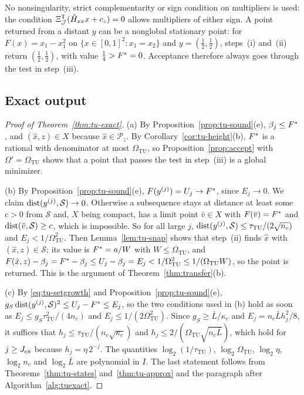No nonsingularity, strict complementarity or sign condition on multipliers is
used: the condition $\Xi_{\mathcal J}^{\mathsf T}(\hat H_{xx}x+c_z)=0$ allows
multipliers of either sign. A point returned from a distant $y$ can be a
nonglobal stationary point: for $F(x)=x_1-x_1^2$ on
$\{x\in[0,1]^2:x_1=x_2\}$ and $y=(\frac12,\frac12)$, steps~(i) and~(ii)
return $(\frac12,\frac12)$, with value $\frac14>F^{*}=0$. Acceptance therefore
always goes through the test in step~(iii).

\subsection{Exact output}\label{app:tu-exact-proof}

\begin{proof}[Proof of Theorem~\ref{thm:tu-exact}]
(a) By Proposition~\ref{prop:tu-sound}(e), $\beta_j\le F^{*}$, and
$(\hat x,z)\in X$ because $\hat x\in\mathcal P_z$. By
Corollary~\ref{cor:tu-height}(b), $F^{*}$ is a rational with denominator at most
$\Omega_{\mathrm{TU}}$, so Proposition~\ref{prop:accept} with
$\Omega'=\Omega_{\mathrm{TU}}$ shows that a point that passes the test in
step~(iii) is a global minimizer.

(b) By Proposition~\ref{prop:tu-sound}(e), $F(y^{(j)})=U_j\to F^{*}$, since
$E_j\to0$. We claim $\operatorname{dist}(y^{(j)},\mathcal S)\to0$. Otherwise a subsequence
stays at distance at least some $c>0$ from $\mathcal S$ and, $X$ being compact,
has a limit point $\bar v\in X$ with $F(\bar v)=F^{*}$ and
$\operatorname{dist}(\bar v,\mathcal S)\ge c$, which is impossible. So for all large $j$,
$\operatorname{dist}(y^{(j)},\mathcal S)\le\tau_{\mathrm{TU}}/(2\sqrt{n_c})$ and
$E_j<1/\Omega_{\mathrm{TU}}^2$. Then Lemma~\ref{lem:tu-snap} shows that
step~(ii) finds $\hat x$ with $(\hat x,z)\in\mathcal S$; its value is
$F^{*}=a/W$ with $W\le\Omega_{\mathrm{TU}}$, and
$F(\hat x,z)-\beta_j=F^{*}-\beta_j\le U_j-\beta_j=E_j<1/\Omega_{\mathrm{TU}}^2
\le1/(\Omega_{\mathrm{TU}}W)$, so the point is returned. This is the argument
of Theorem~\ref{thm:transfer}(b).

(c) By \eqref{eq:tu-setgrowth} and Proposition~\ref{prop:tu-sound}(e),
$g_S\operatorname{dist}(y^{(j)},\mathcal S)^2\le U_j-F^{*}\le E_j$, so the two conditions used
in (b) hold as soon as $E_j\le g_S\tau_{\mathrm{TU}}^2/(4n_c)$ and
$E_j\le1/(2\Omega_{\mathrm{TU}}^2)$. Since $g_S\ge\bar L/\kappa_c$ and
$E_j=n_c\bar Lh_j^2/8$, it suffices that
$h_j\le\tau_{\mathrm{TU}}/(n_c\sqrt{\kappa_c})$ and
$h_j\le2/(\Omega_{\mathrm{TU}}\sqrt{n_c\bar L})$, which hold for
$j\ge J_{\rm ex}$ because $h_j=\eta\,2^{-j}$. The quantities
$\log_2(1/\tau_{\mathrm{TU}})$, $\log_2\Omega_{\mathrm{TU}}$, $\log_2\eta$,
$\log_2n_c$ and $\log_2\bar L$ are polynomial in $I$. The last statement
follows from Theorems~\ref{thm:tu-states} and~\ref{thm:tu-approx} and the
paragraph after Algorithm~\ref{alg:tuexact}.
\end{proof}

